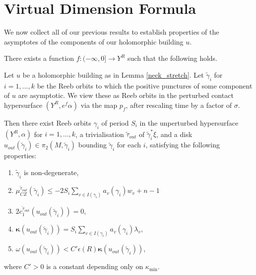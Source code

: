 \documentclass{article}
\numberwithin{equation}{section}
\numberwithin{figure}{section}
\begin{document}
\section{Virtual Dimension Formula}
We now collect all of our previous results to establish properties of the asymptotes of the components of our holomorphic building $u$.
\begin{lem}
\label{orbit_properties_estimates}
There exists a function $f:(-\infty,0]\rightarrow Y^R$ such that the following holds.

Let $u$ be a holomorphic building as in Lemma \ref{neck_stretch}. Let $\tilde{\gamma}_i$ for $i=1,...,k$ be the Reeb orbits to which the positive punctures of some component of $u$ are asymptotic. We view these as Reeb orbits in the perturbed contact hypersurface $(Y^R,e^f\alpha)$ via the map $p_f$, after rescaling time by a factor of $\sigma$. 

Then there exist Reeb orbits $\gamma_i$ of period $S_i$ in the unperturbed hypersurface $(Y^R,\alpha)$ for $i=1,...,k$, a trivialisation $\tilde{\tau}_{out}$ of $\tilde{\gamma}_i^*\xi$, and a disk $u_{out}(\tilde{\gamma}_i)\in\pi_2(M,\tilde{\gamma}_i)$ bounding $\tilde{\gamma}_i$ for each $i$, satisfying the following properties:
\begin{enumerate}
    \item $\tilde{\gamma}_i$ is non-degenerate,
    \item $\mu_{CZ}^{\tilde{\tau}_{out}}(\tilde{\gamma}_i)\leq -2S_i\sum_{v\in I(\gamma_i)}a_v(\gamma_i)w_v+n-1$
    \item $2c_1^{\tilde{\tau}_{out}}(u_{out}(\tilde{\gamma}_i))=0$,
    \item $\pmb{\kappa}(u_{out}(\tilde{\gamma}_i))=S_i\sum_{v\in I(\gamma_i)}a_v(\gamma_i)\lambda_v$,
\item $\omega(u_{out}(\tilde{\gamma}_i))<C'\epsilon(R)\pmb{\kappa}(u_{out}(\tilde{\gamma}_i))$,
\end{enumerate}
where $C'>0$ is a constant depending only on $\kappa_{\min}$.
\end{lem}
\end{document}
